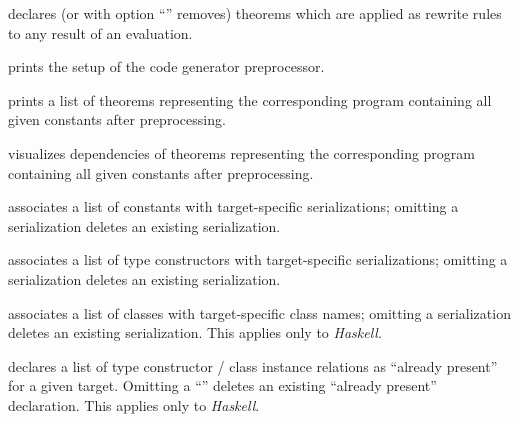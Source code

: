 \begin{isabellebody}
\begin{isamarkuptext}
\begin{description}
  \item \hyperlink{attribute.HOL.code-post}{\mbox{}} declares (or with option ``'' removes) theorems which are applied as rewrite rules to any
  result of an evaluation.

  \item \hyperlink{command.HOL.print-codeproc}{\mbox{}} prints the setup of the code
  generator preprocessor.

  \item \hyperlink{command.HOL.code-thms}{\mbox{}} prints a list of theorems
  representing the corresponding program containing all given
  constants after preprocessing.

  \item \hyperlink{command.HOL.code-deps}{\mbox{}} visualizes dependencies of
  theorems representing the corresponding program containing all given
  constants after preprocessing.

  \item \hyperlink{command.HOL.code-const}{\mbox{}} associates a list of constants
  with target-specific serializations; omitting a serialization
  deletes an existing serialization.

  \item \hyperlink{command.HOL.code-type}{\mbox{}} associates a list of type
  constructors with target-specific serializations; omitting a
  serialization deletes an existing serialization.

  \item \hyperlink{command.HOL.code-class}{\mbox{}} associates a list of classes
  with target-specific class names; omitting a serialization deletes
  an existing serialization.  This applies only to \emph{Haskell}.

  \item \hyperlink{command.HOL.code-instance}{\mbox{}} declares a list of type
  constructor / class instance relations as ``already present'' for a
  given target.  Omitting a ``'' deletes an existing
  ``already present'' declaration.  This applies only to
  \emph{Haskell}.


\end{description}
\end{isamarkuptext}
\end{isabellebody}
